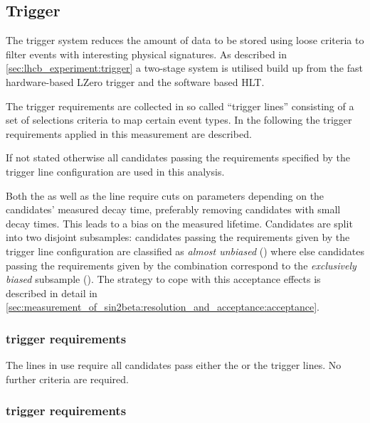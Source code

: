 \subsection{Trigger}
\label{sec:measurement_of_sin2beta:data_preparation:trigger}

The \LHCb trigger system reduces the amount of data to be stored using loose
criteria to filter events with interesting physical signatures. As described in
\cref{sec:lhcb_experiment:trigger} a two-stage system is utilised build up from
the fast hardware-based \acf{LZero} trigger and the software based \acf{HLT}.

The trigger requirements are collected in so called \enquote{trigger lines}
consisting of a set of selections criteria to map certain event types. In the
following the trigger requirements applied in this measurement are described.

If not stated otherwise all candidates passing the requirements specified by the
trigger line configuration \TriggerReq are used in this analysis.

Both the \HLTOneTrackMuon as well as the \HLTTwoDiMuonDetachedJpsi line require
cuts on parameters depending on the candidates' measured decay time, preferably
removing candidates with small decay times. This leads to a bias on the measured
lifetime. Candidates are split into two disjoint subsamples: candidates passing
the requirements given by the trigger line configuration \TriggerReqAU are
classified as \emph{almost unbiased} (\textbf{\catAU}) where else candidates
passing the requirements given by the combination \TriggerReqEB correspond to
the \emph{exclusively biased} subsample (\textbf{\catEB}). The strategy to cope
with this acceptance effects is described in detail in
\cref{sec:measurement_of_sin2beta:resolution_and_acceptance:acceptance}.

\subsubsection{\LZero trigger requirements}
\label{sec:measurement_of_sin2beta:data_preparation:trigger:lzero}

The \HLT lines in use require all candidates pass either the \LZeroMuon or the
\LZeroDiMuon trigger lines. No further \LZero criteria are required.

\subsubsection{\HLTOne trigger requirements}
\label{sec:measurement_of_sin2beta:data_preparation:trigger:hlt1}

